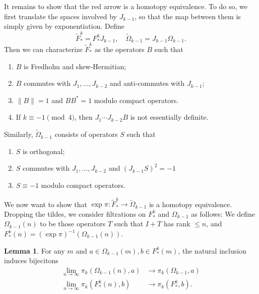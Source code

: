 \documentclass{shortart}
\theoremstyle{definition}
\newtheorem*{lemma}{Lemma}
\begin{document}
It remains to show that the red arrow is a homotopy equivalence. To do so, we first translate the spaces involved by $J_{k - 1}$, so that the map between them is simply given by exponentiation. Define
\[
  \tilde{F}^k_* = F^k_* J_{k - 1},\quad \tilde{\Omega}_{k - 1} = J_{k - 1} \Omega_{k - 1}.
\]
Then we can characterize $\tilde{F}^k_*$ as the operators $B$ such that
\begin{enumerate}
  \item $B$ is Fredholm and skew-Hermitian;
  \item $B$ commutes with $J_1, \ldots, J_{k - 2}$ and anti-commutes with $J_{k - 1}$;
  \item $\|B\| = 1$ and $BB^* = 1$ modulo compact operators.
  \item If $k \equiv -1 \pmod 4$, then $J_1 \cdots J_{k - 2} B$ is not essentially definite.
\end{enumerate}
Similarly, $\tilde{\Omega}_{k - 1}$ consists of operators $S$ such that
\begin{enumerate}
  \item $S$ is orthogonal;
  \item $S$ commutes with $J_1, \ldots, J_{k - 2}$ and $(J_{k - 1} S)^2 = -1$
  \item $S \equiv -1$ modulo compact operators.
\end{enumerate}

We now want to show that $\exp \pi: \tilde{F}_*^k \to \tilde{\Omega}_{k - 1}$ is a homotopy equivalence. Dropping the tildes, we consider filtrations on $F_*^k$ and $\Omega_{k - 1}$ as follows: We define $\Omega_{k - 1}(n)$ to be those operators $T$ such that $I + T$ has rank $\leq n$, and $F_*^k(n) = (\exp \pi)^{-1} (\Omega_{k - 1}(n))$.

\begin{lemma}
  For any $m$ and $a \in \Omega_{k - 1}(m), b \in F^k_*(m)$, the natural inclusion induces bijecitons
  \begin{align*}
    \lim_{n \to \infty} \pi_k(\Omega_{k - 1}(n), a) &\to \pi_k(\Omega_{k - 1}, a)\\
    \lim_{n \to \infty} \pi_k(F_*^k(n), b) &\to \pi_k(F_*^k, b).
  \end{align*}
\end{lemma}
\end{document}
